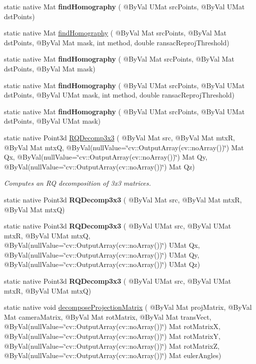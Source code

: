 \begin{DoxyCompactItemize}
\item 
static native Mat {\bfseries find\+Homography} ( @By\+Val U\+Mat src\+Points, @By\+Val U\+Mat dst\+Points)
\item 
static native Mat \hyperlink{group__calib3d_ga7460fd1ec11b17261dc7b2208a1f2d9f}{find\+Homography} ( @By\+Val Mat src\+Points, @By\+Val Mat dst\+Points, @By\+Val Mat mask, int method, double ransac\+Reproj\+Threshold)
\item 
static native Mat {\bfseries find\+Homography} ( @By\+Val Mat src\+Points, @By\+Val Mat dst\+Points, @By\+Val Mat mask)
\item 
static native Mat {\bfseries find\+Homography} ( @By\+Val U\+Mat src\+Points, @By\+Val U\+Mat dst\+Points, @By\+Val U\+Mat mask, int method, double ransac\+Reproj\+Threshold)
\item 
static native Mat {\bfseries find\+Homography} ( @By\+Val U\+Mat src\+Points, @By\+Val U\+Mat dst\+Points, @By\+Val U\+Mat mask)
\item 
static native Point3d \hyperlink{group__calib3d_ga34838b4072f5a8e1eb0dc619c7ac8261}{R\+Q\+Decomp3x3} ( @By\+Val Mat src, @By\+Val Mat mtxR, @By\+Val Mat mtxQ, @By\+Val(null\+Value=\char`\"{}cv\+::\+Output\+Array(cv\+::no\+Array())\char`\"{}) Mat Qx, @By\+Val(null\+Value=\char`\"{}cv\+::\+Output\+Array(cv\+::no\+Array())\char`\"{}) Mat Qy, @By\+Val(null\+Value=\char`\"{}cv\+::\+Output\+Array(cv\+::no\+Array())\char`\"{}) Mat Qz)
\begin{DoxyCompactList}\small\item\em Computes an RQ decomposition of 3x3 matrices. \end{DoxyCompactList}\item 
static native Point3d {\bfseries R\+Q\+Decomp3x3} ( @By\+Val Mat src, @By\+Val Mat mtxR, @By\+Val Mat mtxQ)
\item 
static native Point3d {\bfseries R\+Q\+Decomp3x3} ( @By\+Val U\+Mat src, @By\+Val U\+Mat mtxR, @By\+Val U\+Mat mtxQ, @By\+Val(null\+Value=\char`\"{}cv\+::\+Output\+Array(cv\+::no\+Array())\char`\"{}) U\+Mat Qx, @By\+Val(null\+Value=\char`\"{}cv\+::\+Output\+Array(cv\+::no\+Array())\char`\"{}) U\+Mat Qy, @By\+Val(null\+Value=\char`\"{}cv\+::\+Output\+Array(cv\+::no\+Array())\char`\"{}) U\+Mat Qz)
\item 
static native Point3d {\bfseries R\+Q\+Decomp3x3} ( @By\+Val U\+Mat src, @By\+Val U\+Mat mtxR, @By\+Val U\+Mat mtxQ)
\item 
static native void \hyperlink{group__calib3d_gadf0e43ed7b680f17d039735e4a9f64c5}{decompose\+Projection\+Matrix} ( @By\+Val Mat proj\+Matrix, @By\+Val Mat camera\+Matrix, @By\+Val Mat rot\+Matrix, @By\+Val Mat trans\+Vect, @By\+Val(null\+Value=\char`\"{}cv\+::\+Output\+Array(cv\+::no\+Array())\char`\"{}) Mat rot\+MatrixX, @By\+Val(null\+Value=\char`\"{}cv\+::\+Output\+Array(cv\+::no\+Array())\char`\"{}) Mat rot\+MatrixY, @By\+Val(null\+Value=\char`\"{}cv\+::\+Output\+Array(cv\+::no\+Array())\char`\"{}) Mat rot\+MatrixZ, @By\+Val(null\+Value=\char`\"{}cv\+::\+Output\+Array(cv\+::no\+Array())\char`\"{}) Mat euler\+Angles)

\end{DoxyCompactItemize}
